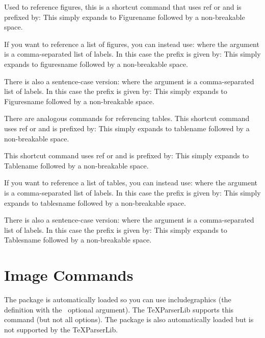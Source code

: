 \documentclass[toc=listof]{scrreport}
\begin{document}
Used to reference figures, this is a shortcut command that uses
\gls{ref} or  and is prefixed by:
This simply expands to \gls{Figurename} followed by a non-breakable
space.

If you want to reference a list of figures, you can instead use:
where the argument is a comma-separated list of labels.
In this case the prefix is given by:
This simply expands to \gls{figuresname} followed by a non-breakable
space.

There is also a sentence-case version:
where the argument is a comma-separated list of labels.
In this case the prefix is given by:
This simply expands to \gls{Figuresname} followed by a non-breakable
space.

There are analogous commands for referencing tables.
This shortcut command uses \gls{ref} or  and is prefixed by:
This simply expands to \gls{tablename} followed by a non-breakable
space.

This shortcut command uses \gls{ref} or  and is prefixed by:
This simply expands to \gls{Tablename} followed by a non-breakable
space.

If you want to reference a list of tables, you can instead use:
where the argument is a comma-separated list of labels.
In this case the prefix is given by:
This simply expands to \gls{tablesname} followed by a non-breakable
space.

There is also a sentence-case version:
where the argument is a comma-separated list of labels.
In this case the prefix is given by:
This simply expands to \gls{Tablesname} followed by a non-breakable
space.


\section{Image Commands}
\label{sec:imagecmds}

The  package is automatically loaded so you can use
\gls{includegraphics} (the definition with the \keyvallist\ optional
argument). The \gls{TeXParserLib} supports this command (but not
all options). The  package is also automatically loaded
but is not supported by the \gls{TeXParserLib}.
\end{document}

